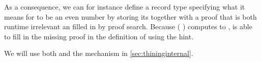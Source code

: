 
As a consequence, we can for instance define a record type specifying what it
means for  to be an even number by storing its 
together with a proof that is both runtime irrelevant an filled in by proof search.
%
Because ( \IdrisFunction{*}  \IdrisFunction{==} )
computes to , \idris{} is able to fill in the missing proof in the
definition of  using the  hint.

\noindent
\begin{minipage}[t]{0.55\textwidth}
\end{minipage}\hfill
\begin{minipage}[t]{0.4\textwidth}
\end{minipage}

We will use both  and the  mechanism in
\cref{sec:thininginternal}.

